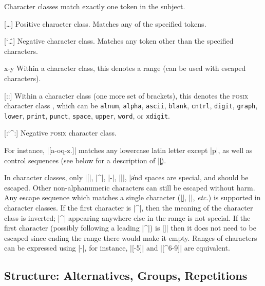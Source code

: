 \documentclass[oneside]{book}
\newenvironment{l3regex-syntax}
  {\begin{itemize}\def\\{\char`\\}\def\makelabel##1{\hss\llap{\ttfamily##1}}}
  {\end{itemize}}
\begin{document}
Character classes match exactly one token in the subject.
\begin{l3regex-syntax}
  \item[{[\ldots{}]}] Positive character class.
    Matches any of the specified tokens.
  \item[{[\char`\^\ldots{}]}] Negative character class.
    Matches any token other than the specified characters.
  \item[{x-y}] Within a character class, this denotes a range (can be
    used with escaped characters).
  \item[{[:\meta{name}:]}] Within a character class (one more set of
    brackets), this denotes the \textsc{posix} character class
    , which can be \texttt{alnum}, \texttt{alpha},
    \texttt{ascii}, \texttt{blank}, \texttt{cntrl}, \texttt{digit},
    \texttt{graph}, \texttt{lower}, \texttt{print}, \texttt{punct},
    \texttt{space}, \texttt{upper}, \texttt{word}, or \texttt{xdigit}.
  \item[{[:\char`\^\meta{name}:]}] Negative \textsc{posix} character class.
\end{l3regex-syntax}
For instance, |[a-oq-z\cC.]| matches any lowercase latin letter
except |p|, as well as control sequences (see below for a description
of |\c|).

In character classes, only |[|, |^|, |-|, |]|, |\| and spaces are
special, and should be escaped. Other non-alphanumeric characters can
still be escaped without harm. Any escape sequence which matches a
single character (|\d|, |\D|, \emph{etc.}) is supported in character
classes.  If the first character is |^|, then
the meaning of the character class is inverted; |^| appearing anywhere
else in the range is not special.  If the first character (possibly
following a leading |^|) is |]| then it does not need to be escaped
since ending the range there would make it empty.
Ranges of characters
can be expressed using |-|, for instance, |[-5]| and |[^6-9]| are
equivalent.

\subsection{Structure: Alternatives, Groups, Repetitions}
\end{document}
